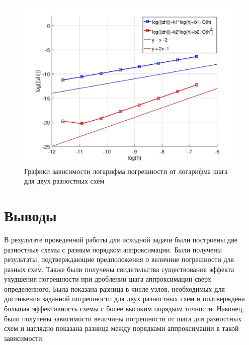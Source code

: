 \documentclass[12pt]{article}
\begin{document}
\begin{figure}[ht]
\begin{center}
\includegraphics[width=\linewidth]{loglog.jpg} 
\end{center}
\caption{Графики зависимости логарифма погрешности от логарифма шага для двух разностных схем}
\end{figure}

\pagebreak

\section{Выводы}

В результате проведенной работы для исходной задачи были построены две разностные схемы с разным порядком аппроксимации. Были получены результаты, подтверждающие предположения о величине погрешности для разных схем. Также были получены свидетельства существования эффекта ухудшения погрешности при дроблении шага аппроксимации сверх определенного. Была показана разница в числе узлов, необходимых для достижения заданной погрешности для двух разностных схем и подтверждена большая эффективность схемы с более высоким порядком точности. Наконец, были получены зависимости величины погрешности от шага для разностных схем и наглядно показана разница между порядками аппроксимации в такой зависимости.
\end{document}

